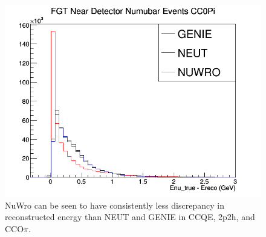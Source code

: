 \documentclass[12pt]{article}
\begin{document}
\begin{figure}[h]
\endminipage
{}
\includegraphics[width=\linewidth]{Ereco_Etrue/numubar_FGT_CC0Pi.png}
\endminipage
\caption{NuWro can be seen to have consistently less discrepancy in reconstructed energy than NEUT and GENIE in CCQE, 2p2h, and CCO$\pi$. }
\label{fig:numubar_Etrue_ereco_FGT_CCQE_2p2h_CC0Pi}
\end{figure}
\end{document}
